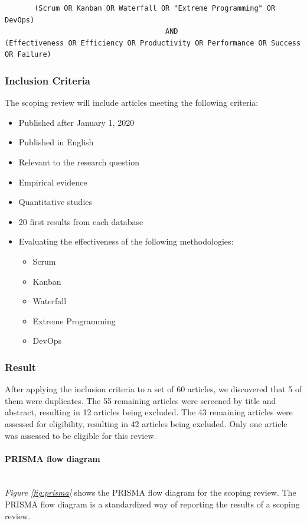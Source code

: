 \documentclass[12pt]{article}
\newcommand{\subsubsubsection}[1]{\paragraph{#1}\mbox{}\\}
\begin{document}
\begin{adjustwidth}{-4em}{0pt}
\begin{verbatim}
       (Scrum OR Kanban OR Waterfall OR "Extreme Programming" OR DevOps) 
                                      AND
(Effectiveness OR Efficiency OR Productivity OR Performance OR Success OR Failure)
\end{verbatim}
\end{adjustwidth}

\subsubsection{Inclusion Criteria}
The scoping review will include articles meeting the following criteria:
\begin{itemize}
  \item Published after January 1, 2020
  \item Published in English
  \item Relevant to the research question
  \item Empirical evidence
  \item Quantitative studies
  \item 20 first results from each database
  \item Evaluating the effectiveness of the following methodologies:
  \begin{itemize}
    \item Scrum
    \item Kanban
    \item Waterfall
    \item Extreme Programming
    \item DevOps
  \end{itemize}
\end{itemize}

\subsubsection{Result}
After applying the inclusion criteria to a set of 60 articles, we discovered that 5 of them were duplicates.
The 55 remaining articles were screened by title and abstract, resulting in 12 articles being excluded.
The 43 remaining articles were assessed for eligibility, resulting in 42 articles being excluded.
Only one article was assessed to be eligible for this review.

\subsubsubsection{PRISMA flow diagram}
\textit{Figure \ref{fig:prisma}} shows the PRISMA \cite{PRISMAStatement} flow diagram for the scoping review.
The PRISMA flow diagram is a standardized way of reporting the results of a scoping review.
\end{document}

